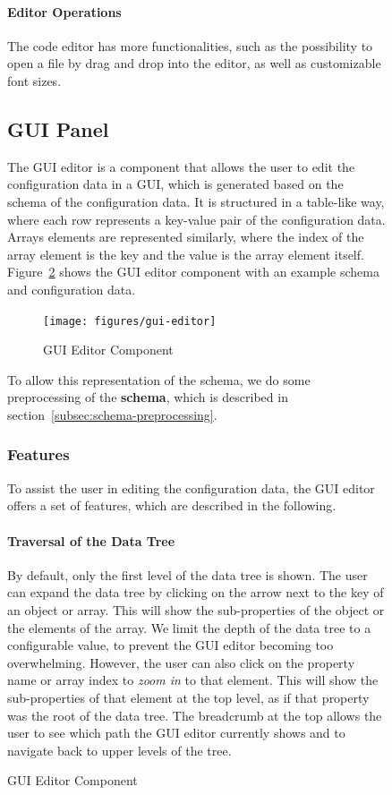 \begin{figure}[h]

\paragraph{Editor Operations}
The code editor has more functionalities, such as the possibility to open a file by drag and drop into the editor, as well as customizable font sizes.

\subsection{GUI Panel}\label{subsec:gui-editor}

The GUI editor is a component that allows the user to edit the configuration data in a GUI, which is generated based on the schema of the configuration data.
It is structured in a table-like way, where each row represents a key-value pair of the configuration data.
Arrays elements are represented similarly, where the index of the array element is the key and the value is the array element itself.
Figure~\ref{fig:gui-editor} shows the GUI editor component with an example schema and configuration data.

\begin{figure}[!t]
    \centering
    \texttt{[image: figures/gui-editor]} %
    \caption{GUI Editor Component}
    \label{fig:gui-editor}
\end{figure}

To allow this representation of the schema, we do some preprocessing of the \textbf{schema}, which is described in section~\ref{subsec:schema-preprocessing}.

\subsubsection{Features}\label{subsubsec:gui-editor-features}

To assist the user in editing the configuration data, the GUI editor offers a set of features, which are described in the following.

\paragraph{Traversal of the Data Tree}
By default, only the first level of the data tree is shown.
The user can expand the data tree by clicking on the arrow next to the key of an object or array.
This will show the sub-properties of the object or the elements of the array.
We limit the depth of the data tree to a configurable value, to prevent the GUI editor becoming too overwhelming.
However, the user can also click on the property name or array index to \textit{zoom in} to that element.
This will show the sub-properties of that element at the top level, as if that property was the root of the data tree.
The breadcrumb at the top allows the user to see which path the GUI editor currently shows and to navigate back to upper levels of the tree.


\end{figure}
